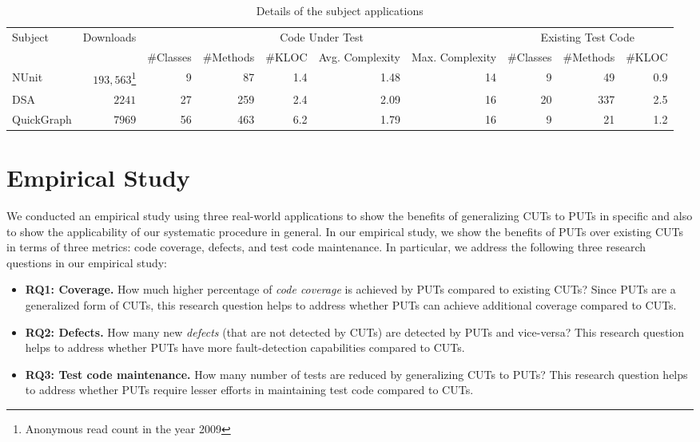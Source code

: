 \begin{table*}[t]%
\centering
\begin{minipage}{\textwidth}
\centering
\begin{tabular}{|l|r|r|r|r|r|r|r|r|r|}
\hline
Subject 		& Downloads 	& \multicolumn{5}{|c|}{Code Under Test} 															&	\multicolumn{3}{|c|}{Existing Test Code} 	\\ \cline{3-10}
						& 						&	\#Classes	&	\#Methods	& \#KLOC	& Avg. Complexity & Max. Complexity	&	\#Classes	&	\#Methods &	\#KLOC						\\ \hline\hline
NUnit				&		$193,563$\footnote{Anonymous read count in the year 2009}
													&	9					&	87  			&		1.4		&				1.48 			& 14 							&			9			&			49		&		0.9							\\ \hline
DSA					&		$2241$		&	27  			&	259 			&		2.4		&				2.09 			& 16							&			20		&			337		&		2.5							\\ \hline		
QuickGraph	&		$7969$ 		&	56				&	463				&		6.2		&				1.79			& 16							&			9			&			21		&		1.2							\\ \hline
\end{tabular}
\end{minipage} \vspace*{-3ex}
\caption{Details of the subject applications} \vspace*{-3ex}
\label{tab:subjectmetrics}
\end{table*} 

\section{Empirical Study}

We conducted an empirical study using three real-world applications to show the benefits of generalizing CUTs to PUTs in specific and also to show the applicability of our systematic procedure in general. In our empirical study, we show the benefits of PUTs over existing CUTs in terms of three metrics: code coverage, defects, and test code maintenance. In particular, we address the following three research questions in our empirical study:

\begin{itemize}
	\item \textbf{RQ1: Coverage.} How much higher percentage of \emph{code coverage} is achieved by PUTs compared to existing CUTs? Since PUTs are a generalized form of CUTs, this research question helps to address whether PUTs can achieve additional coverage compared to CUTs.
	\item \textbf{RQ2: Defects.} How many new \emph{defects} (that are not detected by CUTs) are detected by PUTs and vice-versa? This research question helps to address whether PUTs have more fault-detection capabilities compared to CUTs.
	\item \textbf{RQ3: Test code maintenance.} How many number of tests are reduced by generalizing CUTs to PUTs? This research question helps to address whether PUTs require lesser efforts in maintaining test code compared to CUTs.
\end{itemize}

